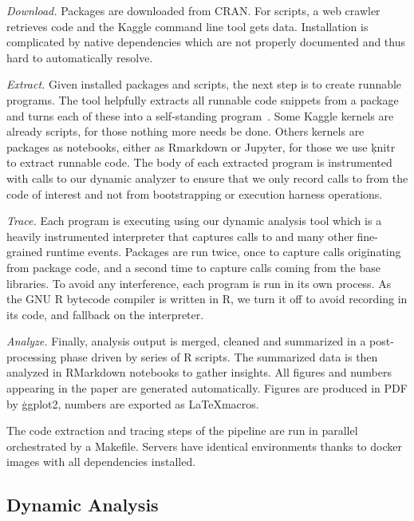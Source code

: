 \documentclass[review,nonacm,screen,acmsmall,anonymous=true]{acmart}
\begin{document}
\medskip
\begin{compactenum}
\item \emph{Download.} Packages are downloaded from CRAN. For scripts, a web
  crawler retrieves code and the Kaggle command line tool gets data.
  Installation is complicated by native dependencies which are not properly
  documented and thus hard to automatically resolve.
\item \emph{Extract.} Given installed packages and scripts, the next step is to
  create runnable programs. The \genthat tool helpfully extracts all runnable
  code snippets from a package and turns each of these into a self-standing
  program~\cite{issta18}. Some Kaggle kernels are already scripts, for those
  nothing more needs be done. Others kernels are packages as notebooks, either
  as Rmarkdown or Jupyter, for those we use \c{knitr} to extract runnable code.
  The body of each extracted program is instrumented with calls to our dynamic
  analyzer to ensure that we only record calls to \eval from the code of
  interest and not from bootstrapping or execution harness operations.
\item \emph{Trace.} Each program is executing using our dynamic analysis tool
  which is a heavily instrumented interpreter that captures calls to \eval and
  many other fine-grained runtime events. Packages are run twice, once to
  capture \eval calls originating from package code, and a second time to
  capture calls coming from the base libraries. To avoid any interference, each
  program is run in its own process.
  As the GNU R bytecode compiler is written in R, we turn it off
  to avoid recording \eval in its code, and fallback on the interpreter.
\item \emph{Analyze.} Finally, analysis output is merged, cleaned and summarized
  in a post-processing phase driven by series of R scripts. The summarized data
  is then analyzed in RMarkdown notebooks to gather insights. All figures and
  numbers appearing in the paper are generated automatically. Figures are
  produced in PDF by \c{ggplot2}, numbers are exported as \LaTeX macros.
\end{compactenum}

\medskip\noindent The code extraction and tracing steps of the pipeline are run
in parallel~\cite{GNUparallel} orchestrated by a Makefile. Servers have
identical environments thanks to docker images with all dependencies installed.

\subsection{Dynamic Analysis}
\end{document}

